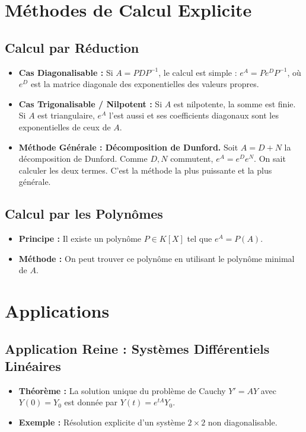\documentclass[12pt, a4paper, parskip=full]{report}
\theoremstyle{agregstyle}
\begin{document}
\section{Méthodes de Calcul Explicite}
\subsection{Calcul par Réduction}
\begin{itemize}
    \item \textbf{Cas Diagonalisable :} Si $A=PDP^{-1}$, le calcul est simple : $e^A = P e^D P^{-1}$, où $e^D$ est la matrice diagonale des exponentielles des valeurs propres.
    \item \textbf{Cas Trigonalisable / Nilpotent :} Si $A$ est nilpotente, la somme est finie. Si $A$ est triangulaire, $e^A$ l'est aussi et ses coefficients diagonaux sont les exponentielles de ceux de $A$.
    \item \textbf{Méthode Générale : Décomposition de Dunford.} Soit $A=D+N$ la décomposition de Dunford. Comme $D,N$ commutent, $e^A = e^D e^N$. On sait calculer les deux termes. C'est la méthode la plus puissante et la plus générale.
\end{itemize}
\subsection{Calcul par les Polynômes}
\begin{itemize}
    \item \textbf{Principe :} Il existe un polynôme $P \in K[X]$ tel que $e^A=P(A)$.
    \item \textbf{Méthode :} On peut trouver ce polynôme en utilisant le polynôme minimal de $A$.
\end{itemize}

\section{Applications}
\subsection{Application Reine : Systèmes Différentiels Linéaires}
\begin{itemize}
    \item \textbf{Théorème :} La solution unique du problème de Cauchy $Y' = AY$ avec $Y(0)=Y_0$ est donnée par $Y(t) = e^{tA}Y_0$.
    \item \textbf{Exemple :} Résolution explicite d'un système $2 \times 2$ non diagonalisable.
\end{itemize}
\end{document}
